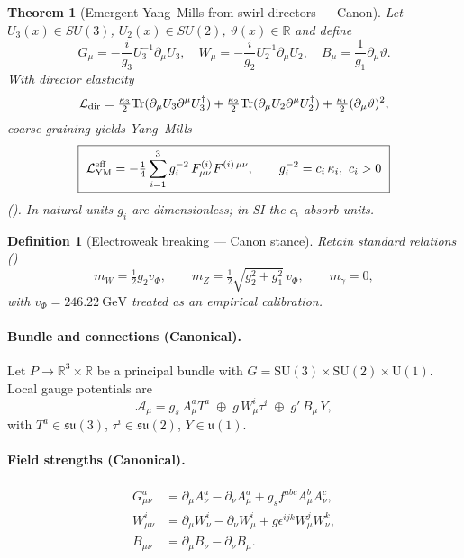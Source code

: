 \documentclass[11pt]{article}
\newcommand{\Tr}{\mathrm{Tr}}
\newtheorem{theorem}{Theorem}[section]
\newtheorem{definition}{Definition}[section]
\begin{document}
\begin{theorem}[Emergent Yang–Mills from swirl directors — Canon]
    Let $U_3(x)\!\in\!SU(3)$, $U_2(x)\!\in\!SU(2)$, $\vartheta(x)\!\in\!\mathbb R$ and define
    \[
        G_\mu=-\frac{i}{g_3}U_3^{-1}\partial_\mu U_3,\quad
        W_\mu=-\frac{i}{g_2}U_2^{-1}\partial_\mu U_2,\quad
        B_\mu=\frac{1}{g_1}\partial_\mu\vartheta.
    \]
    With director elasticity
    \[
        \mathcal L_{\rm dir}=\tfrac{\kappa_3}{2}\Tr(\partial_\mu U_3\partial^\mu U_3^\dagger)
        +\tfrac{\kappa_2}{2}\Tr(\partial_\mu U_2\partial^\mu U_2^\dagger)
        +\tfrac{\kappa_1}{2}(\partial_\mu\vartheta)^2,
    \]
    coarse-graining yields Yang–Mills
    \[
        \boxed{\ \mathcal L_{\rm YM}^{\rm eff}=-\tfrac14\sum_{i=1}^3 g_i^{-2}\,F^{(i)}_{\mu\nu}F^{(i)\,\mu\nu},\qquad g_i^{-2}=c_i\,\kappa_i,\ c_i>0\ }
    \]
    (\cite{YangMills1954}). In natural units $g_i$ are dimensionless; in SI the $c_i$ absorb units.
\end{theorem}

\begin{definition}[Electroweak breaking — Canon stance]
    Retain standard relations (\cite{Weinberg1967,EnglertBrout1964,Higgs1964})
    \[
        m_W=\tfrac12 g_2 v_\Phi,\qquad m_Z=\tfrac12\sqrt{g_2^2+g_1^2}\,v_\Phi,\qquad m_\gamma=0,
    \]
    with $v_\Phi=246.22~\mathrm{GeV}$ treated as an \emph{empirical calibration}.
\end{definition}

\paragraph{Bundle and connections (Canonical).}
Let $P\!\to\! \mathbb{R}^{3}\times\mathbb{R}$ be a principal bundle with
$G=\mathrm{SU}(3)\times\mathrm{SU}(2)\times\mathrm{U}(1)$.
Local gauge potentials are
\[
	\mathcal{A}_\mu
	= g_s\,A^a_\mu T^a \;\oplus\; g\,W^i_\mu \tau^i \;\oplus\; g'\,B_\mu\,Y,
\]
with $T^a\in\mathfrak{su}(3)$, $\tau^i\in\mathfrak{su}(2)$, $Y\in\mathfrak u(1)$.

\paragraph{Field strengths (Canonical).}
\begin{align}
	G^a_{\mu\nu} &= \partial_\mu A^a_\nu-\partial_\nu A^a_\mu + g_s f^{abc} A^b_\mu A^c_\nu,\label{eq:Gmunu}\\
	W^i_{\mu\nu} &= \partial_\mu W^i_\nu-\partial_\nu W^i_\mu + g \epsilon^{ijk} W^j_\mu W^k_\nu,\label{eq:Wmunu}\\
	B_{\mu\nu} &= \partial_\mu B_\nu-\partial_\nu B_\mu.\label{eq:Bmunu}
\end{align}
\end{document}
